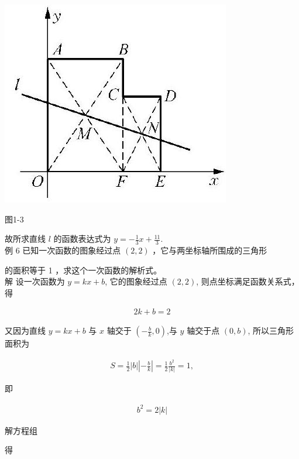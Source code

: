 \documentclass[10pt]{article}
\begin{document}
\begin{center}
\includegraphics[max width=\textwidth]{2024_10_30_1bf34f7aeb61f11d11d3g-013(1)}
\end{center}

图1-3

故所求直线 $l$ 的函数表达式为 $y=-\frac{1}{3} x+\frac{11}{3}$.\\
例 6 已知一次函数的图象经过点 $(2,2)$ ，它与两坐标轴所围成的三角形

的面积等于 1 ，求这个一次函数的解析式。\\
解 设一次函数为 $y=k x+b$, 它的图象经过点 $(2,2)$, 则点坐标满足函数关系式，得

\begin{align*}
2 k+b=2
\end{align*}

又因为直线 $y=k x+b$ 与 $x$ 轴交于 $\left(-\frac{b}{k}, 0\right)$,与 $y$ 轴交于点 $(0, b)$, 所以三角形面积为

\begin{align*}
S=\frac{1}{2}|b|\left|-\frac{b}{k}\right|=\frac{1}{2} \frac{b^{2}}{|k|}=1,
\end{align*}

即

\begin{align*}
b^{2}=2|k|
\end{align*}

解方程组

得
\end{document}
